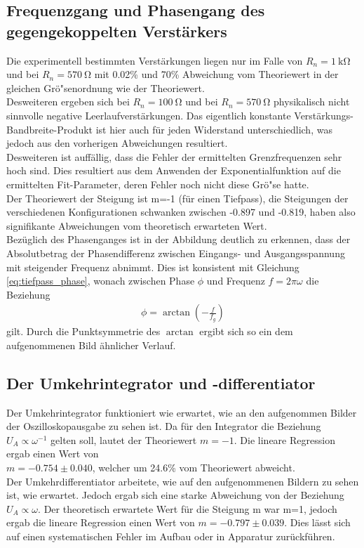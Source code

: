 \documentclass[]{scrartcl}
\begin{document}
\subsection{Frequenzgang und Phasengang des gegengekoppelten Verstärkers}
Die experimentell bestimmten Verstärkungen liegen nur im Falle von $R_n=\SI{1}{\kilo\ohm}$ und bei $R_n=\SI{570}{\ohm}$ mit 0.02\% und 70\% Abweichung vom Theoriewert in der gleichen Grö"senordnung wie der Theoriewert. \\
Desweiteren ergeben sich bei $R_n=\SI{100}{\ohm}$ und bei $R_n=\SI{570}{\ohm}$ physikalisch nicht sinnvolle negative Leerlaufverstärkungen. Das eigentlich konstante Verstärkungs-Bandbreite-Produkt ist hier auch für jeden Widerstand unterschiedlich, was jedoch aus den vorherigen Abweichungen resultiert. \\
Desweiteren ist auffällig, dass die Fehler der ermittelten Grenzfrequenzen sehr hoch sind. Dies resultiert aus dem Anwenden der Exponentialfunktion auf die ermittelten Fit-Parameter, deren Fehler noch nicht diese Grö"se hatte. \\
Der Theoriewert der Steigung ist m=-1 (für einen Tiefpass), die Steigungen der verschiedenen Konfigurationen schwanken zwischen -0.897 und -0.819, haben also signifikante Abweichungen vom theoretisch erwarteten Wert. \\
Bezüglich des Phasenganges ist in der Abbildung deutlich zu erkennen, dass der Absolutbetrag der Phasendifferenz zwischen Eingangs- und Ausgangsspannung mit steigender Frequenz abnimmt. Dies ist konsistent mit Gleichung \ref{eq:tiefpass_phase}, wonach zwischen Phase $\phi$ und Frequenz $f=2\pi\omega$ die Beziehung 
\begin{align*}
\phi=\arctan\left(-\frac{f}{f_g}\right)
\end{align*}
gilt. Durch die Punktsymmetrie des $\arctan$ ergibt sich so ein dem aufgenommenen Bild ähnlicher Verlauf.

\subsection{Der Umkehrintegrator und -differentiator}
Der Umkehrintegrator funktioniert wie erwartet, wie an den aufgenommen Bilder der Oszilloskopausgabe zu sehen ist. Da für den Integrator die Beziehung $U_A\propto\omega^{-1}$ gelten soll, lautet der Theoriewert $m=-1$. Die lineare Regression ergab einen Wert von  \\$m=-0.754\pm0.040$, welcher um 24.6\% vom Theoriewert abweicht. \\
Der Umkehrdifferentiator arbeitete, wie auf den aufgenommenen Bildern zu sehen ist, wie erwartet. Jedoch ergab sich eine starke Abweichung von der Beziehung $U_A\propto\omega$. Der theoretisch erwartete Wert für die Steigung m war m=1, jedoch ergab die lineare Regression einen Wert von $m = -0.797 \pm 0.039$. Dies lässt sich auf einen systematischen Fehler im Aufbau oder in Apparatur zurückführen.
\end{document}

